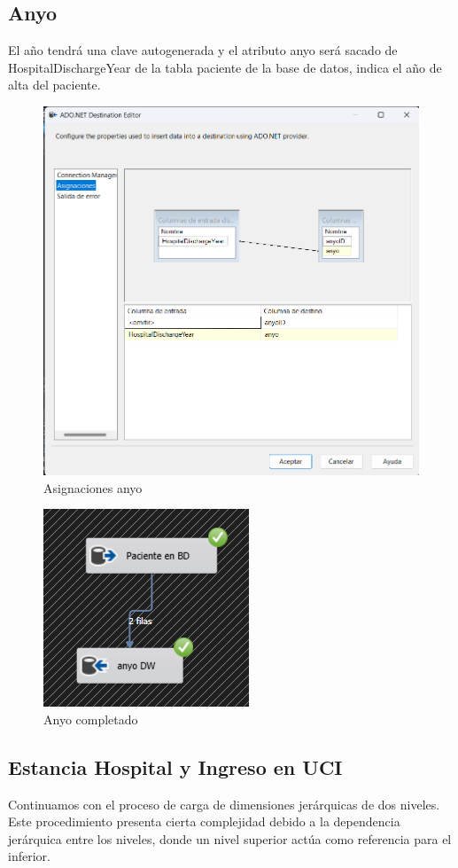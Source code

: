 \documentclass{article}
\begin{document}
	\subsection{Anyo}
	El año tendrá una clave autogenerada y el atributo anyo será sacado de HospitalDischargeYear de la tabla paciente de la base de datos, indica el año de alta del paciente.
	\begin{figure}[H]
		\centering
		\includegraphics[width=.7\linewidth]{./images/asignaciones/anyo.png}
		\caption{Asignaciones anyo}
	\end{figure}
	\begin{figure}[H]
		\centering
		\includegraphics[width=.3\linewidth]{./images/completados/anyo.png}
		\caption{Anyo completado}
	\end{figure}


	\subsection{Estancia Hospital y Ingreso en UCI}
	Continuamos con el proceso de carga de dimensiones jerárquicas de dos niveles. Este procedimiento presenta cierta complejidad debido a la dependencia jerárquica entre los niveles, donde un nivel superior actúa como referencia para el inferior.
\end{document}
